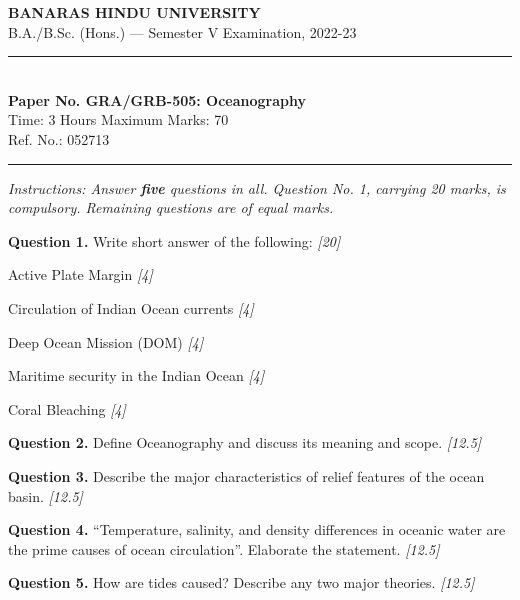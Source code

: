 \documentclass[11pt,a4paper]{article}
\newcommand{\pts}[1]{\hfill   \textit{[#1]}}
\begin{document}
\begin{center}
  {\large\bfseries BANARAS HINDU UNIVERSITY}\\[2pt]
  {\normalsize B.A./B.Sc. (Hons.) --- Semester V Examination, 2022-23}\\[6pt]
  \rule{0.8\linewidth}{0.5pt}\\[6pt]
  {\large\bfseries Paper No. GRA/GRB-505: Oceanography}\\[4pt]
  {\normalsize Time: 3 Hours \hfill Maximum Marks: 70}\\[2pt]
  {\small Ref. No.: 052713}
\end{center}
\rule{\linewidth}{0.4pt}
\smallskip



\noindent   \textit{Instructions: Answer   \textbf{five} questions in all. Question No. 1, carrying 20 marks, is compulsory. Remaining questions are of equal marks.}
\bigskip




\noindent   \textbf{Question 1.} Write short answer of the following: \pts{20}

\begin{parts}
  \item Active Plate Margin \pts{4}
  \item Circulation of Indian Ocean currents \pts{4}
  \item Deep Ocean Mission (DOM) \pts{4}
  \item Maritime security in the Indian Ocean \pts{4}
  \item Coral Bleaching \pts{4}
\end{parts}

\medskip


\noindent   \textbf{Question 2.} Define Oceanography and discuss its meaning and scope. \pts{12.5}

\medskip


\noindent   \textbf{Question 3.} Describe the major characteristics of relief features of the ocean basin. \pts{12.5}

\medskip


\noindent   \textbf{Question 4.} ``Temperature, salinity, and density differences in oceanic water are the prime causes of ocean circulation''. Elaborate the statement. \pts{12.5}

\medskip


\noindent   \textbf{Question 5.} How are tides caused? Describe any two major theories. \pts{12.5}

\medskip
\end{document}
